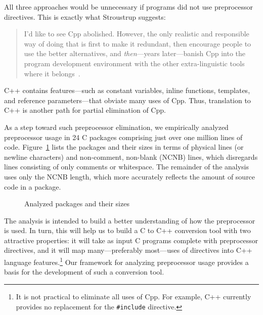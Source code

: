 \documentclass[11pt]{article}
\begin{document}
All three approaches would be unnecessary if programs did not use
preprocessor directives.  This is exactly what Stroustrup suggests:
\begin{quote}
  I'd like to see Cpp abolished.  However, the only realistic and
  responsible way of doing that is first to make it redundant, then
  encourage people to use the better alternatives, and {\em then\/}---years
  later---banish Cpp into the program development environment with the
  other extra-linguistic tools where it
  belongs~\cite[p.~426]{Stroustrup-DesignEvolution}.
\end{quote}
C++ contains features---such as constant variables, inline functions,
templates, and reference parameters---that obviate many uses of Cpp.  Thus,
translation to C++
is another path for partial elimination of Cpp.  


As a step toward such preprocessor elimination, we empirically analyzed
preprocessor usage in 24 C packages comprising just over one million lines
of code.  Figure~\ref{fig:packages} lists the packages and their sizes in
terms of physical lines (or newline characters) and non-comment, non-blank
(NCNB) lines, which disregards lines consisting of only comments or
whitespace.  The remainder of the analysis uses only the NCNB length, which
more accurately reflects the amount of source code in a package.

\begin{figure}
\centering
{\small
  \setlength{\tabcolsep}{.25em}
  
}
\caption{Analyzed packages and their sizes}
\label{fig:packages}
\end{figure}

The analysis is intended to build a better understanding of how the
preprocessor is used.  In turn, this will help us to build a C to C++
conversion tool with two attractive properties: it will take as input C
programs complete with preprocessor directives, and it will map
many---preferably most---uses of directives into C++ language
features.\footnote{It is not practical to eliminate all uses of Cpp.  For
  example, C++ currently provides no replacement for the {\tt \#include}
  directive.} Our framework for analyzing preprocessor usage provides a
basis for the development of such a conversion tool.
\end{document}
